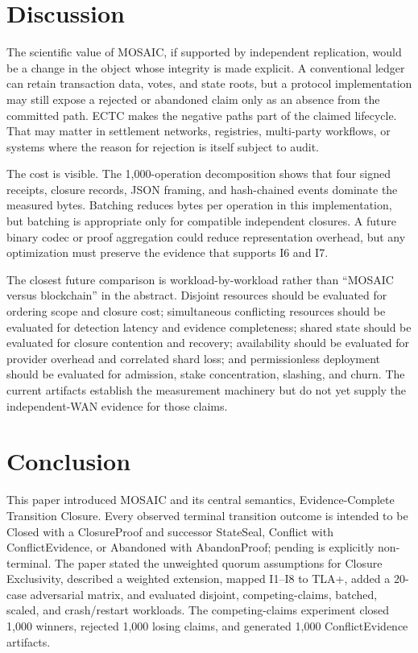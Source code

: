 \documentclass{ledger}
\begin{document}
\section{Discussion}
The scientific value of MOSAIC, if supported by independent replication, would be a change in the object whose integrity is made explicit. A conventional ledger can retain transaction data, votes, and state roots, but a protocol implementation may still expose a rejected or abandoned claim only as an absence from the committed path. ECTC makes the negative paths part of the claimed lifecycle. That may matter in settlement networks, registries, multi-party workflows, or systems where the reason for rejection is itself subject to audit.

The cost is visible. The 1,000-operation decomposition shows that four signed receipts, closure records, JSON framing, and hash-chained events dominate the measured bytes. Batching reduces bytes per operation in this implementation, but batching is appropriate only for compatible independent closures. A future binary codec or proof aggregation could reduce representation overhead, but any optimization must preserve the evidence that supports I6 and I7.

The closest future comparison is workload-by-workload rather than “MOSAIC versus blockchain” in the abstract. Disjoint resources should be evaluated for ordering scope and closure cost; simultaneous conflicting resources should be evaluated for detection latency and evidence completeness; shared state should be evaluated for closure contention and recovery; availability should be evaluated for provider overhead and correlated shard loss; and permissionless deployment should be evaluated for admission, stake concentration, slashing, and churn. The current artifacts establish the measurement machinery but do not yet supply the independent-WAN evidence for those claims.

\section{Conclusion}
This paper introduced MOSAIC and its central semantics, Evidence-Complete Transition Closure. Every observed terminal transition outcome is intended to be Closed with a ClosureProof and successor StateSeal, Conflict with ConflictEvidence, or Abandoned with AbandonProof; pending is explicitly non-terminal. The paper stated the unweighted quorum assumptions for Closure Exclusivity, described a weighted extension, mapped I1--I8 to TLA+, added a 20-case adversarial matrix, and evaluated disjoint, competing-claims, batched, scaled, and crash/restart workloads. The competing-claims experiment closed 1,000 winners, rejected 1,000 losing claims, and generated 1,000 ConflictEvidence artifacts.
\end{document}
